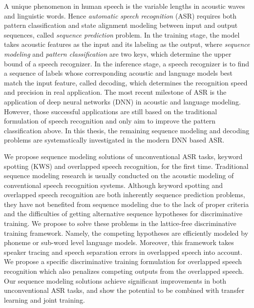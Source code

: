 \begin{englishabstract}

A unique phenomenon in human speech is the variable lengths in acoustic waves and linguistic words. Hence {\em automatic speech recognition} (ASR) requires both pattern classification and  state alignment modeling between input and output sequences, called {\em sequence prediction} problem. In the training stage, the model takes  acoustic features as the input and its labeling as the output, where {\em sequence modeling} and {\em pattern classification} are two keys, which determine the upper bound of a speech recognizer. In the inference stage, a speech recognizer is to find a sequence of labels whose corresponding acoustic and language models best match the input feature, called {decoding}, which determines the recognition speed and precision in real application. 
The most recent milestone of ASR is the application of deep neural networks (DNN) in acoustic and language modeling.
However, those successful applications are still based on the traditional formulation of speech recognition and only aim to improve the pattern classification above. In this thesis, the remaining sequence modeling and decoding problems are systematically investigated in the modern DNN based ASR.

We propose sequence modeling solutions of unconventional ASR tasks, keyword spotting (KWS) and overlapped speech recognition,  for the first time. Traditional sequence modeling research is usually conducted on the acoustic modeling of conventional speech recognition systems. Although keyword spotting and overlapped speech recognition are both inherently sequence prediction problems, they have not benefited from sequence modeling due to the lack of proper criteria and the difficulties of getting alternative sequence hypotheses for discriminative training. We propose to solve these problems in the lattice-free discriminative training framework. Namely, the competing hypotheses are efficiently modeled by phoneme or sub-word level language models. Moreover, this framework takes  speaker tracing and speech separation errors in overlapped speech into account. 
We propose a specific discriminative training formulation for overlapped speech recognition which also penalizes competing outputs from the overlapped speech. Our sequence modeling solutions achieve significant improvements in both unconventional ASR tasks, and show the potential to be combined with transfer learning and joint training.


\end{englishabstract}
